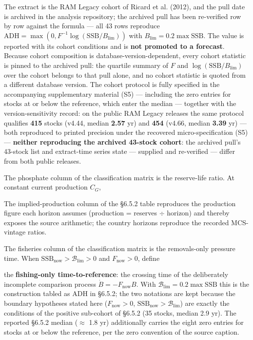 \documentclass[11pt]{article}
\begin{document}
The extract is the RAM Legacy cohort of Ricard et al. (2012), and the pull date is archived in the analysis repository; the archived pull has been re-verified row by row against the formula --- all 43 rows reproduce \(\mathrm{ADH}=\allowbreak{}\max(0,\allowbreak{}F^{-1}\log(\mathrm{SSB}/B_{\mathrm{lim}}))\) with \(B_{\mathrm{lim}}=\allowbreak{}0.2\max\mathrm{SSB}\). The value is reported with its cohort conditions and is \textbf{not promoted to a forecast}. Because cohort composition is database-version-dependent, every cohort statistic is pinned to the archived pull: the quartile summary of \(F\) and \(\log(\mathrm{SSB}/B_{\mathrm{lim}})\) over the cohort belongs to that pull alone, and no cohort statistic is quoted from a different database version. The cohort protocol is fully specified in the accompanying supplementary material (S5) --- including the zero entries for stocks at or below the reference, which enter the median --- together with the version-sensitivity record: on the public RAM Legacy releases the same protocol qualifies \textbf{415} stocks (v4.44, median \textbf{2.57} yr) and \textbf{454} (v4.66, median \textbf{3.39} yr) --- both reproduced to printed precision under the recovered micro-specification (S5) --- \textbf{neither reproducing the archived 43-stock cohort}: the archived pull's 43-stock list and extract-time series state --- supplied and re-verified --- differ from both public releases.

The phosphate column of the classification matrix is the reserve-life ratio. At constant current production \(C_G\),

The implied-production column of the \S6.5.2 table reproduces the production figure each horizon assumes (production = reserves \(\div\) horizon) and thereby exposes the source arithmetic; the country horizons reproduce the recorded MCS-vintage ratios.

The fisheries column of the classification matrix is the removals-only pressure time. When \(\mathrm{SSB}_{\mathrm{now}}>\mathcal B_{\mathrm{lim}}>0\) and \(F_{\mathrm{now}}>0\), define

the \textbf{fishing-only time-to-reference}: the crossing time of the deliberately incomplete comparison process \(\dot B=-F_{\mathrm{now}}B\). With \(\mathcal B_{\mathrm{lim}}=\allowbreak{}0.2\max\mathrm{SSB}\) this is the construction tabled as ADH in \S6.5.2; the two notations are kept because the boundary hypotheses stated here (\(F_{\mathrm{now}}>0\), \(\mathrm{SSB}_{\mathrm{now}}>\mathcal B_{\mathrm{lim}}\)) are exactly the conditions of the positive sub-cohort of \S6.5.2 (35 stocks, median 2.9 yr). The reported \S6.5.2 median (\ensuremath{\approx} 1.8 yr) additionally carries the eight zero entries for stocks at or below the reference, per the zero convention of the source caption.
\end{document}
